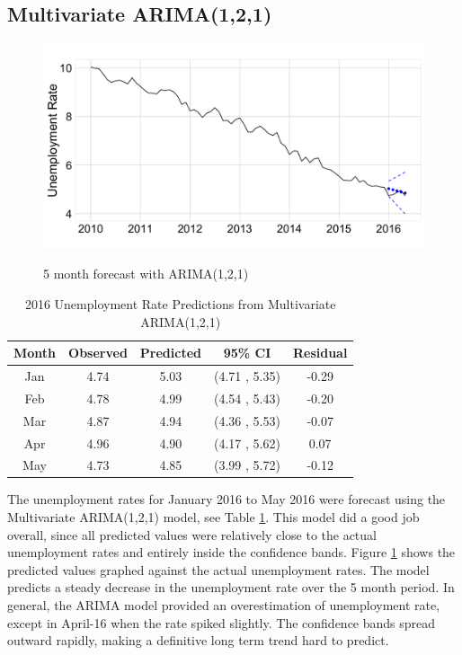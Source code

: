 \documentclass[twoside,twocolumn]{article}
\begin{document}
\subsection{Multivariate ARIMA(1,2,1)}

   \begin{figure}[htb]
    	\centering
     	\caption{5 month forecast with ARIMA(1,2,1)}
     	\includegraphics[width=\linewidth]{images/ARIMApred}
     	\label{fig:arimapred}
 \end{figure}

\begin{table}[ht]
\centering
\caption{2016 Unemployment Rate Predictions from Multivariate ARIMA(1,2,1)}
\label{tab:arimaforecast}
\begin{tabular}{ccccc}
  \hline
 Month & Observed & Predicted& 95\% CI  & Residual \\
  \hline
Jan & 4.74 & 5.03 & (4.71 , 5.35) & -0.29 \\
Feb & 4.78 & 4.99 & (4.54 , 5.43) & -0.20 \\
Mar & 4.87 & 4.94 & (4.36 , 5.53) & -0.07 \\
Apr & 4.96 & 4.90 & (4.17 , 5.62) & 0.07 \\
May & 4.73 & 4.85 & (3.99 , 5.72) & -0.12 \\
   \hline
\end{tabular}
\end{table}

The unemployment rates for January 2016 to May 2016 were forecast using the Multivariate ARIMA(1,2,1) model, see Table \ref{tab:arimaforecast}.  This model did a good job overall, since all predicted values were relatively close to the actual unemployment rates and entirely inside the confidence bands.  Figure \ref{fig:arimapred} shows the predicted values graphed against the actual unemployment rates. The model predicts a steady decrease in the unemployment rate over the 5 month period.  In general, the ARIMA model provided an overestimation of unemployment rate, except in April-16 when the rate spiked slightly. The confidence bands spread outward rapidly, making a definitive long term trend hard to predict.
\end{document}
